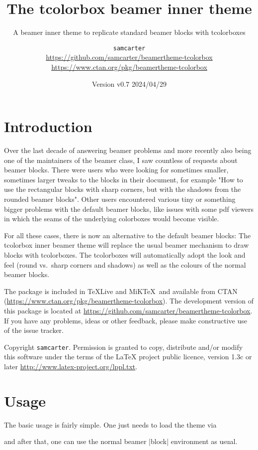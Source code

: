 \documentclass{scrartcl}
\title{The tcolorbox beamer inner theme}
\subtitle{A beamer inner theme to replicate standard beamer blocks with tcolorboxes}
\author{%
  \texorpdfstring{
    \texttt{samcarter}\\
    \url{https://github.com/samcarter/beamertheme-tcolorbox}\\
    \url{https://www.ctan.org/pkg/beamertheme-tcolorbox}
  }{samcarter}}
\date{Version v0.7 \textendash{} 2024/04/29}
\begin{document}
\maketitle

\section{Introduction}
\label{intro}

Over the last decade of answering beamer problems and more recently also being one of the maintainers of the beamer class, I saw countless of requests about beamer blocks. There were users who were looking for sometimes smaller, sometimes larger tweaks to the blocks in their document, for example "How to use the rectangular blocks with sharp corners, but with the shadows from the rounded beamer blocks". Other users encountered various tiny or something bigger problems with the default beamer blocks, like issues with some pdf viewers in which the seams of the underlying colorboxes would become visible.

For all these cases, there is now an alternative to the default beamer blocks: The tcolorbox inner beamer theme will replace the usual beamer mechanism to draw blocks with tcolorboxes. The tcolorboxes will automatically adopt the look and feel (round vs.\ sharp corners and shadows) as well as the colours of the normal beamer blocks.

The package is included in \TeX{}Live and MiK\TeX\ and available from \textsc{CTAN} (\url{https://www.ctan.org/pkg/beamertheme-tcolorbox}).
The development version of this package is located at \url{https://github.com/samcarter/beamertheme-tcolorbox}. If you have any problems, ideas or other feedback, please make constructive use of the issue tracker.

Copyright  \texttt{samcarter}. Permission is granted to copy, distribute and\slash or modify this software under the terms of the LaTeX project public licence, version 1.3c or later \url{http://www.latex-project.org/lppl.txt}.

\section{Usage}

The basic usage is fairly simple. One just needs to load the theme via
\begin{tcolorbox}[lower separated=false,title={Usage}]
\begin{samcode}
\end{samcode}
\end{tcolorbox}
and after that, one can use the normal beamer \saminline|block| environment as usual.
\end{document}
